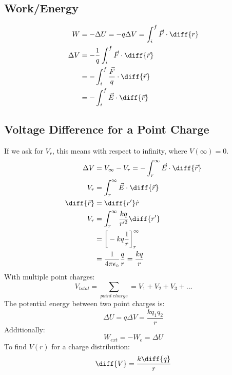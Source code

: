\documentclass{math}
\begin{document}
\subsection*{Work/Energy}
\begin{align*}
  W &= -\Delta U = -q\Delta V = \int_{i}^{f}\vec{F}\cdot\diff{r} \\
  \Delta V &= -\frac{1}{q}\int_{i}^{f}\vec{F}\cdot\diff{\vec{r}} \\
  &= -\int_{i}^{f}\frac{\vec{F}}{q}\cdot\diff{\vec{r}} \\
  &= -\int_{i}^{f}\vec{E}\cdot\diff{\vec{r}}
\end{align*}

\subsection*{Voltage Difference for a Point Charge}
If we ask for \( V_r \), this means with respect to infinity, where \( V(\infty)
= 0 \).
\begin{align*}
  \Delta V &= V_{\infty}-V_r = -\int_{r}^{\infty}\vec{E}\cdot\diff{\vec{r}} \\
  V_r &= \int_{r}^{\infty}\vec{E}\cdot\diff{\vec{r}} \\
  \diff{\vec{r}} &= \diff{r'}\hat{r} \\
  V_r &= \int_{r}^{\infty}\frac{kq}{r'^2}\diff{r'} \\
  &= \bigg[-kq\frac{1}{r}\bigg]_{r}^{\infty} \\
  &= \frac{1}{4\pi\epsilon_{\circ}}\frac{q}{r} = \frac{kq}{r}
\end{align*}
With multiple point charges:
\[ V_{total} = \sum_{point~charge} = V_1+V_2+V_3+\dots \]
The potential energy between two point charges is:
\[ \Delta U = q\Delta V = \frac{kq_1q_2}{r} \]
Additionally:
\[ W_{ext} = -W_e = \Delta U \]
To find \( V(r) \) for a charge distribution:
\[ \diff{V} = \frac{k\diff{q}}{r} \]
\clearpage
\end{document}
